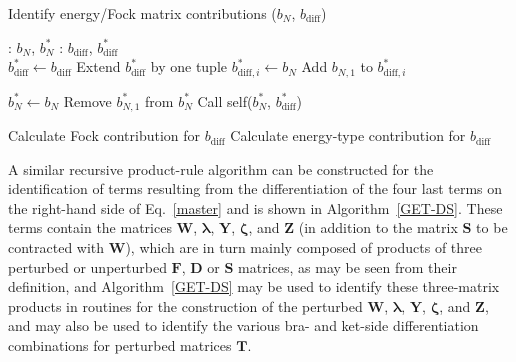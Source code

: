 \documentclass[%
 reprint,
 amsmath,amssymb,
 aps,
]{revtex4-1}
\begin{document}
\begin{algorithm}
\caption{Identify energy/Fock matrix contributions ($b_{N}$, $b_{\text{diff}}$)}
\label{ID-CALC-FOCK}
\begin{algorithmic}
: $b_{N}$, $b_{N}^{*}$
: $b_{\text{diff}}$, $b_{\text{diff}}^{*}$\\

         \State $b_{\text{diff}}^{*} \gets b_{\text{diff}}$
            \State Extend $b_{\text{diff}}^{*}$ by one tuple
            \State $b_{\text{diff}, i}^{*} \gets b_{N}$
         \Else
            \State Add $b_{N, 1}$ to $b_{\text{diff}, i}^{*}$
         \EndIf

         \State $b_{N}^{*} \gets b_{N}$
         \State Remove $b_{N, 1}^{*}$  from $b_{N}^{*}$
         \State Call self($b_{N}^{*}$, $b_{\text{diff}}^{*}$)
      \EndFor
   \Else

                  \State Calculate Fock contribution for $b_{\text{diff}}$
               \EndIf
               \State Calculate energy-type contribution for $b_{\text{diff}}$
            \EndIf
         \EndIf
      \EndIf
   \EndIf
\end{algorithmic}
\end{algorithm}

A similar recursive product-rule algorithm can be constructed for the identification of terms resulting from the differentiation of the four last terms on the right-hand side of Eq.~\eqref{master} and is shown in Algorithm~\ref{GET-DS}. These terms contain the matrices $\mathbf{W}$, $\mathbf{\lambda}$, $\mathbf{Y}$, $\mathbf{\zeta}$, and $\mathbf{Z}$ (in addition to the matrix $\mathbf{S}$ to be contracted with $\mathbf{W}$), which are in turn mainly composed of products of three perturbed or unperturbed $\mathbf{F}$, $\mathbf{D}$ or $\mathbf{S}$ matrices, as may be seen from their definition, and Algorithm~\ref{GET-DS} may be used to identify these three-matrix products in routines for the construction of the perturbed $\mathbf{W}$, $\mathbf{\lambda}$, $\mathbf{Y}$, $\mathbf{\zeta}$, and $\mathbf{Z}$, and may also be used to identify the various bra- and ket-side differentiation combinations for perturbed matrices $\mathbf{T}$.
\end{document}

